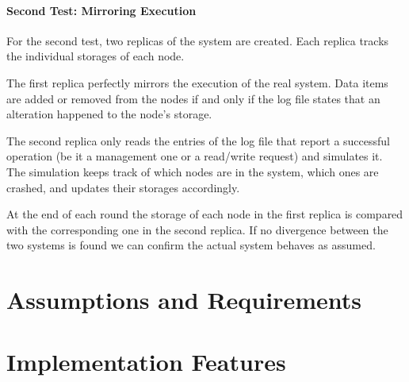 \documentclass{article}
\begin{document}
\paragraph {Second Test: Mirroring Execution}
For the second test, two replicas of the system are created.
Each replica tracks the individual storages of each node.

The first replica perfectly mirrors the execution of the real system. Data items are added or removed from the nodes if and only if the log file states that an alteration happened to the node's storage.

The second replica only reads the entries of the log file that report a successful operation (be it a management one or a read/write request) and simulates it.\\
The simulation keeps track of which nodes are in the system, which ones are crashed, and updates their storages accordingly.

At the end of each round the storage of each node in the first replica is compared with the corresponding one in the second replica. If no divergence between the two systems is found we can confirm the actual system behaves as assumed.

\section{Assumptions and Requirements}

\section{Implementation Features}

\end{document}

